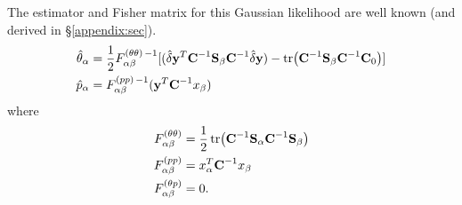 \documentclass{article}
\begin{document}
The estimator and Fisher matrix for this Gaussian likelihood are well known (and derived in  \S\ref{appendix:sec}).
\begin{align}
\hat{\theta}_\alpha & = \frac{1}{2} F^{(\theta \theta)\,-1}_{\alpha \beta} [(\hat{\delta} \textbf{y}^T \textbf{C}^{-1} \textbf{S}_\beta \textbf{C}^{-1} \hat{\delta} \textbf{y}) - \tr(\textbf{C}^{-1} \textbf{S}_\beta \textbf{C}^{-1} \textbf{C}_0)] \nonumber \\
\hat{p}_\alpha  &=  F^{(pp)\, -1}_{\alpha \beta}  (\textbf{y}^T  \textbf{C}^{-1} x_\beta)
\label{estimators:eqn}
\end{align}
where  
\begin{align}
F^{(\theta\theta)}_{\alpha\beta}& = \frac{1}{2} \tr(\textbf{C}^{-1} \textbf{S}_\alpha \textbf{C}^{-1}  \textbf{S}_\beta)\\
F^{(pp)}_{\alpha\beta} & =x^T_\alpha \textbf{C}^{-1} x_\beta\\
F^{(\theta p)}_{\alpha\beta} & = 0.
\end{align}
\end{document}
